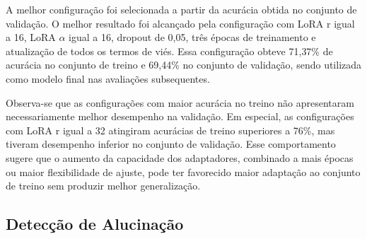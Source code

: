 \documentclass[conference]{IEEEtran}
\begin{document}
A melhor configuração foi selecionada a partir da acurácia obtida no conjunto de validação. O melhor resultado foi alcançado pela configuração com LoRA r igual a 16, LoRA $\alpha$ igual a 16, dropout de 0{,}05, três épocas de treinamento e atualização de todos os termos de viés. Essa configuração obteve 71{,}37\% de acurácia no conjunto de treino e 69{,}44\% no conjunto de validação, sendo utilizada como modelo final nas avaliações subsequentes.

Observa-se que as configurações com maior acurácia no treino não apresentaram necessariamente melhor desempenho na validação. Em especial, as configurações com LoRA r igual a 32 atingiram acurácias de treino superiores a 76\%, mas tiveram desempenho inferior no conjunto de validação. Esse comportamento sugere que o aumento da capacidade dos adaptadores, combinado a mais épocas ou maior flexibilidade de ajuste, pode ter favorecido maior adaptação ao conjunto de treino sem produzir melhor generalização.

\subsection{Detecção de Alucinação}
\end{document}
